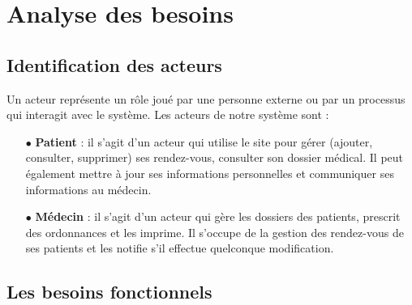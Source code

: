 \documentclass[a4paper]{report}
\begin{document}
\chapter{Analyse des besoins}\label{besoins}
\section{Identification des acteurs}

Un acteur représente un rôle joué par une personne externe ou par un processus qui interagit avec le système.
\newline\newline
Les acteurs de notre système sont :
\newline
\begin{itemize}
    \item[$\bullet$] \textbf{Patient} : il s’agit d’un acteur qui utilise le site pour gérer 
    (ajouter, consulter, supprimer) ses rendez-vous, consulter son dossier médical. 
    Il peut également mettre à jour ses informations personnelles et communiquer ses informations au médecin.
    \item[$\bullet$] \textbf{Médecin} : il s’agit d’un acteur qui gère les dossiers des patients, prescrit des ordonnances et 
    les imprime. Il s’occupe de la gestion des rendez-vous de ses patients et les notifie s’il effectue 
    quelconque modification.
  \end{itemize}
  
\section{Les besoins fonctionnels}
\end{document}
